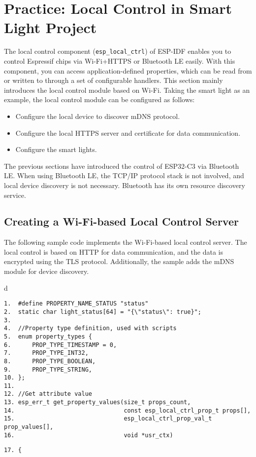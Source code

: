\documentclass[a4paper,12pt]{book}
\begin{document}
\section{Practice: Local Control in Smart Light Project}
The local control component (\verb|esp_local_ctrl|) of ESP-IDF enables you to control Espressif chips via Wi-Fi+HTTPS or Bluetooth LE easily. With this component, you can access application-defined properties, which can be read from or written to through a set of configurable handlers. This section mainly introduces the local control module based on Wi-Fi. Taking the smart light as an example, the local control module can be configured as follows:

\begin{itemize}[noitemsep]
    \item Configure the local device to discover mDNS protocol.
    \item Configure the local HTTPS server and certificate for data communication.
    \item Configure the smart lights.
\end{itemize}

The previous sections have introduced the control of ESP32-C3 via Bluetooth LE. When using Bluetooth LE, the TCP/IP protocol stack is not involved, and local device discovery is not necessary. Bluetooth has its own resource discovery service.

\subsection{Creating a Wi-Fi-based Local Control Server}
The following sample code implements the Wi-Fi-based local control server. The local control is based on HTTP for data communication, and the data is encrypted using the TLS protocol. Additionally, the sample adds the mDNS module for device discovery.


\begin{codebloc}
\begin{tabular}{d}
\vspace{2pt}
\begin{verbatim}
1.  #define PROPERTY_NAME_STATUS "status"
2.  static char light_status[64] = "{\"status\": true}";
3.	
4.  //Property type definition, used with scripts
5.  enum property_types {
6.      PROP_TYPE_TIMESTAMP = 0,
7.      PROP_TYPE_INT32,
8.      PROP_TYPE_BOOLEAN,
9.      PROP_TYPE_STRING,
10. };
11.	
12. //Get attribute value
13. esp_err_t get_property_values(size_t props_count,
14.                               const esp_local_ctrl_prop_t props[],
15.                               esp_local_ctrl_prop_val_t prop_values[],
16.                               void *usr_ctx)
\end{verbatim}
\verb|17. {|
\end{tabular}
\end{codebloc}
\end{document}
